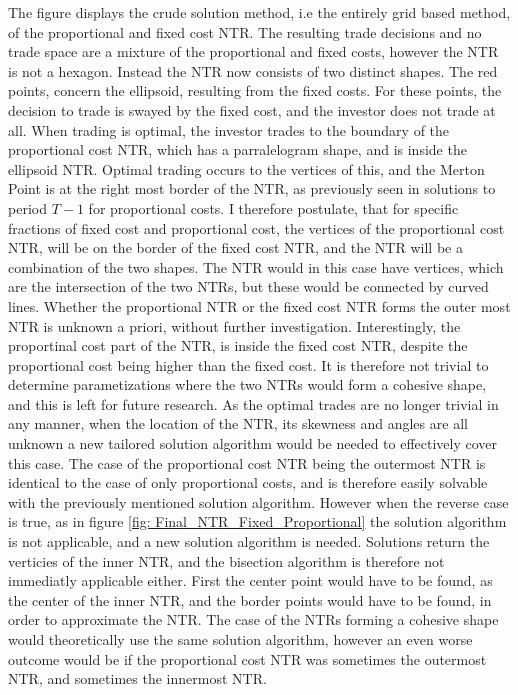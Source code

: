 \documentclass[11pt]{article}
\begin{document}
The figure displays the crude solution method, i.e the entirely grid based method, of the proportional and fixed cost NTR.
The resulting trade decisions and no trade space are a mixture of the proportional and fixed costs, however the NTR is not a hexagon.
Instead the \ac{NTR} now consists of two distinct shapes. The red points, concern the ellipsoid, resulting from the fixed costs.
For these points, the decision to trade is swayed by the fixed cost, and the investor does not trade at all.
When trading is optimal, the investor trades to the boundary of the proportional cost NTR, which has a parralelogram shape, and is inside the ellipsoid NTR.
Optimal trading occurs to the vertices of this, and the Merton Point is at the right most border of the NTR, as previously seen in solutions to period $T-1$ for proportional costs.
I therefore postulate, that for specific fractions of fixed cost and proportional cost, the vertices of the proportional cost NTR,
will be on the border of the fixed cost NTR, and the NTR will be a combination of the two shapes.
The NTR would in this case have vertices, which are the intersection of the two NTRs, but these would be connected by curved lines.
Whether the proportional NTR or the fixed cost NTR forms the outer most NTR is unknown a priori, without further investigation.
Interestingly, the proportinal cost part of the \ac{NTR}, is inside the fixed cost NTR, despite the proportional cost being higher than the fixed cost.
It is therefore not trivial to determine parametizations where the two NTRs would form a cohesive shape, and this is left for future research.
As the optimal trades are no longer trivial in any manner, when the location of the \ac{NTR}, its skewness and angles are all unknown
a new tailored solution algorithm would be needed to effectively cover this case. The case of the proportional cost NTR being the outermost NTR is identical to the case of only proportional costs,
and is therefore easily solvable with the previously mentioned solution algorithm.
However when the reverse case is true, as in figure \ref{fig: Final_NTR_Fixed_Proportional} the solution algorithm is not applicable, and a new solution algorithm is needed.
Solutions return the verticies of the inner NTR, and the bisection algorithm is therefore not immediatly applicable either.
First the center point would have to be found, as the center of the inner NTR, and the border points would have to be found, in order to approximate the NTR.
The case of the NTRs forming a cohesive shape would theoretically use the same solution algorithm, however an even worse outcome would be if the proportional cost NTR was sometimes the outermost NTR, and sometimes the innermost NTR.
\end{document}
